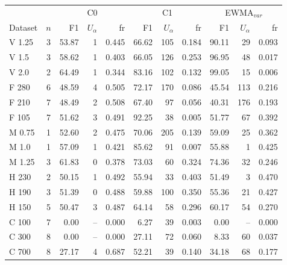 \begin{tabular}{lcrrrrrrrrr}
\hline
 & & \multicolumn{3}{c}{C0} & \multicolumn{3}{c}{C1} & \multicolumn{3}{c}{EWMA$_{var}$} \\
Dataset & $n$ & F1 & $U_\alpha$ & fr & F1 & $U_\alpha$ & fr & F1 & $U_\alpha$ & fr \\ \hline
V  1.25 & 3 & 53.87 & 1 & 0.445 & 66.62 & 105 & 0.184 & 90.11 & 29 & 0.093 \\
V  1.5 & 3 & 58.62 & 1 & 0.403 & 66.05 & 126 & 0.253 & 96.95 & 48 & 0.017 \\
V  2.0 & 2 & 64.49 & 1 & 0.344 & 83.16 & 102 & 0.132 & 99.05 & 15 & 0.006 \\
F  280 & 6 & 48.59 & 4 & 0.505 & 72.17 & 170 & 0.086 & 45.54 & 113 & 0.216 \\
F  210 & 7 & 48.49 & 2 & 0.508 & 67.40 & 97 & 0.056 & 40.31 & 176 & 0.193 \\
F  105 & 7 & 51.62 & 3 & 0.491 & 92.25 & 38 & 0.005 & 51.77 & 67 & 0.392 \\
M  0.75 & 1 & 52.60 & 2 & 0.475 & 70.06 & 205 & 0.139 & 59.09 & 25 & 0.362 \\
M  1.0 & 1 & 57.09 & 1 & 0.421 & 85.62 & 91 & 0.007 & 55.88 & 1 & 0.425 \\
M  1.25 & 3 & 61.83 & 0 & 0.378 & 73.03 & 60 & 0.324 & 74.36 & 32 & 0.246 \\
H  230 & 2 & 50.15 & 1 & 0.492 & 55.94 & 33 & 0.403 & 51.49 & 3 & 0.470 \\
H  190 & 3 & 51.39 & 0 & 0.488 & 59.88 & 100 & 0.350 & 55.36 & 21 & 0.427 \\
H  150 & 5 & 50.47 & 3 & 0.487 & 64.14 & 58 & 0.296 & 60.17 & 54 & 0.270 \\
C  100 & 7 & 0.00 & -- & 0.000 & 6.27 & 39 & 0.003 & 0.00 & -- & 0.000 \\
C  300 & 8 & 0.00 & -- & 0.000 & 27.11 & 72 & 0.060 & 8.33 & 60 & 0.037 \\
C  700 & 8 & 27.17 & 4 & 0.687 & 52.21 & 39 & 0.140 & 34.18 & 68 & 0.177 \\
\hline
\end{tabular}
